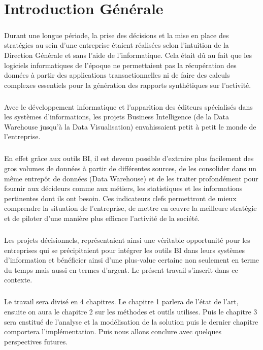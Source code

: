 \chapter*{Introduction Générale}%
%
\paragraph{}
Durant une longue période, la prise des décisions et la mise en place des stratégies au sein d’une entreprise étaient réalisées selon l’intuition de la Direction Générale et sans l’aide de l’informatique. Cela était dû au fait que les logiciels informatiques de l’époque ne permettaient pas la récupération des données à partir des applications transactionnelles ni de faire des calculs complexes essentiels pour la génération des rapports synthétiques sur l’activité.
\paragraph{}
Avec le développement informatique et l’apparition des éditeurs spécialisés dans les systèmes d’informations, les projets Business Intelligence (de la Data Warehouse jusqu’à la Data Visualisation) envahissaient petit à petit le monde de l’entreprise.
\paragraph{}
En effet grâce aux outils BI, il est devenu possible d’extraire plus facilement des gros volumes de données à partir de différentes sources, de les consolider dans un même entrepôt de données (Data Warehouse) et de les traiter profondément pour fournir aux décideurs comme aux métiers, les statistiques et les informations pertinentes dont ils ont besoin. Ces indicateurs clefs permettront de mieux comprendre la situation de l’entreprise, de mettre en œuvre la meilleure stratégie et de piloter d’une manière plus efficace l’activité de la société.
\paragraph{}
Les projets décisionnels, représentaient ainsi une véritable opportunité pour les entreprises qui se précipitaient pour intégrer les outils BI dans leurs systèmes d’information et bénéficier ainsi d’une plus-value certaine non seulement en terme du temps mais aussi en termes d’argent. Le présent travail s’inscrit dans ce contexte. 
\paragraph{}
Le travail sera divisé en 4 chapitres. Le chapitre 1 parlera de l’état de l’art, ensuite on aura le chapitre 2 sur les méthodes et outils utilises. Puis le chapitre 3 sera cnstitué de l'analyse et la modélisation de la solution puis le dernier chapitre comportera l'implémentation. Puis nous allons conclure avec quelques perspectives futures.

